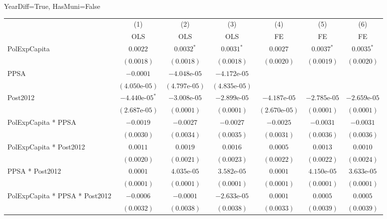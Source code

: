 \begin{table}[H]
    \centering
    \scriptsize
    \begin{minipage}{\textwidth}
    \centering
    {\normalsize YearDiff=True, HasMuni=False}
    \vspace{6pt}
    \begin{tabular}{lcccccc}
        \toprule
         & (1) & (2) & (3) & (4) & (5) & (6) \\
         & OLS & OLS & OLS & FE & FE & FE \\
        \midrule
        PolExpCapita & $0.0022$ & $0.0032^{*}$ & $0.0031^{*}$ & $0.0027$ & $0.0037^{*}$ & $0.0035^{*}$ \\
         & $(0.0018)$ & $(0.0018)$ & $(0.0018)$ & $(0.0020)$ & $(0.0019)$ & $(0.0020)$ \\[4pt]
        PPSA & $-0.0001$ & $-4.048\text{e-}05$ & $-4.172\text{e-}05$ &  &  &  \\
         & $(4.050\text{e-}05)$ & $(4.797\text{e-}05)$ & $(4.835\text{e-}05)$ &  &  &  \\[4pt]
        Post2012 & $-4.440\text{e-}05^{*}$ & $-3.008\text{e-}05$ & $-2.899\text{e-}05$ & $-4.187\text{e-}05$ & $-2.785\text{e-}05$ & $-2.659\text{e-}05$ \\
         & $(2.687\text{e-}05)$ & $(0.0001)$ & $(0.0001)$ & $(2.670\text{e-}05)$ & $(0.0001)$ & $(0.0001)$ \\[4pt]
        PolExpCapita * PPSA & $-0.0019$ & $-0.0027$ & $-0.0027$ & $-0.0025$ & $-0.0031$ & $-0.0031$ \\
         & $(0.0030)$ & $(0.0034)$ & $(0.0035)$ & $(0.0031)$ & $(0.0036)$ & $(0.0036)$ \\[4pt]
        PolExpCapita * Post2012 & $0.0011$ & $0.0019$ & $0.0016$ & $0.0005$ & $0.0013$ & $0.0010$ \\
         & $(0.0020)$ & $(0.0021)$ & $(0.0023)$ & $(0.0022)$ & $(0.0022)$ & $(0.0024)$ \\[4pt]
        PPSA * Post2012 & $0.0001$ & $4.035\text{e-}05$ & $3.582\text{e-}05$ & $0.0001$ & $4.150\text{e-}05$ & $3.633\text{e-}05$ \\
         & $(0.0001)$ & $(0.0001)$ & $(0.0001)$ & $(0.0001)$ & $(0.0001)$ & $(0.0001)$ \\[4pt]
        PolExpCapita * PPSA * Post2012 & $-0.0006$ & $-0.0001$ & $-2.633\text{e-}05$ & $0.0001$ & $0.0005$ & $0.0005$ \\
         & $(0.0032)$ & $(0.0038)$ & $(0.0038)$ & $(0.0033)$ & $(0.0039)$ & $(0.0039)$ \\[4pt]

\end{tabular}
\end{minipage}
\end{table}
